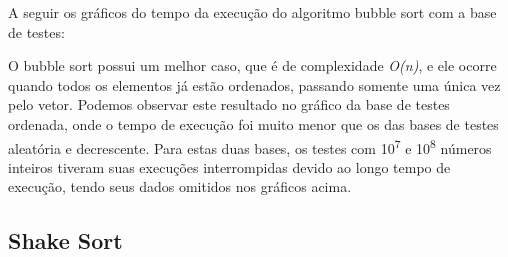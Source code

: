 \documentclass[fleqn,10pt]{SelfArx} %
\begin{document}
A seguir os gráficos do tempo da execução do algoritmo bubble sort com a base de testes:\newline

{\setlength{\parindent}{-0.5em}
}\newline

{\setlength{\parindent}{-0.5em}
}\newline

{\setlength{\parindent}{-0.5em}
}\newline

O bubble sort possui um melhor caso, que é de complexidade \emph{O(n)}, e ele ocorre quando todos os elementos já estão 
ordenados, passando somente uma única vez pelo vetor. Podemos observar este resultado no gráfico da base de testes 
ordenada, onde o tempo de execução foi muito menor que os das bases de testes aleatória e decrescente. Para estas duas 
bases, os testes com 10\textsuperscript{7} e 10\textsuperscript{8} números inteiros tiveram suas execuções interrompidas 
devido ao longo tempo de execução, tendo seus dados omitidos nos gráficos acima.

\subsection{Shake Sort}
\end{document}

